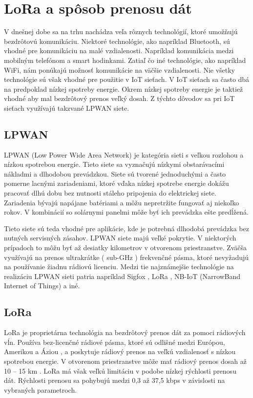 \documentclass[slovak,master]{diploma}
\begin{document}
\chapter{LoRa a spôsob prenosu dát}
V dnešnej dobe sa na trhu nachádza veľa rôznych technológií, ktoré umožňujú bezdrôtovú komunikáciu. Niektoré technológie, ako napríklad Bluetooth, sú vhodné pre komunikáciu na malé 
vzdialenosti. Napríklad komunikácia medzi mobilným telefónom a smart hodinkami. Zatiaľ čo iné technológie, ako napríklad WiFi, nám ponúkajú možnosť komunikácie na väčšie vzdialenosti. 
Nie všetky technológie sú však vhodné pre použitie v IoT sieťach. V IoT sieťach sa často dbá na predpoklad nízkej spotreby energie. Okrem nízkej spotreby energie je taktiež vhodné 
aby mal bezdrôtový prenos veľký dosah. Z týchto dôvodov sa pri IoT sieťach využívajú takzvané LPWAN siete.
\section {LPWAN}
LPWAN (Low Power Wide Area Network) je kategória sieti s veľkou rozlohou a nízkou spotrebou energie. Tieto siete sa vyznačujú nízkymi obstarávacími 
nákladmi a dlhodobou prevádzkou. Siete sú tvorené jednoduchými a často pomerne lacnými zariadeniami, ktoré vďaka nízkej spotrebe energie dokážu pracovať dlhú dobu bez 
nutnosti stáleho pripojenia do elektrickej siete. Zariadenia bývajú napájane batériami a môžu nepretržite fungovať aj niekoľko rokov. V kombinácií so solárnymi panelmi 
môže byť ich prevádzka ešte predĺžená. 

Tieto siete sú teda vhodné pre aplikácie, kde je potrebná dlhodobá prevádzka bez nutných servisných zásahov.
LPWAN siete majú veľké pokrytie. V niektorých prípadoch to môžu byť až desiatky kilometrov v otvorenom priestranstve. Zväčša využívajú na prenos 
ultrakrátke ( sub-GHz ) frekvenčné pásma, ktoré nevyžadujú na používanie žiadnu rádiovú licenciu. 
Medzi tie najznámejšie technológie na realizáciu LPWAN sieti patria napríklad Sigfox \cite{sigfox}, LoRa \cite{lora}, NB-IoT (NarrowBand Internet of Things) a iné.

\section {LoRa}
LoRa je proprietárna technológia na bezdrôtový prenos dát za pomoci rádiových vĺn.
Používa bez-licenčné rádiové pásma, ktoré sú odlišné medzi Európou, Amerikou a Áziou \cite{loraRegionalParameters}, a poskytuje rádiový prenos na veľkú vzdialenosť s nízkou spotrebou energie.
V otvorenom priestranstve môže mať rádiový prenos dosah až 10 -- 15 km \cite{loraDoc}. LoRa má však veľkú limitáciu v podobe nízkej rýchlosti prenosu dát.
Rýchlosti prenosu sa pohybujú medzi 0,3 až 37,5 kbps v závislosti na vybraných parametroch.
\end{document}
